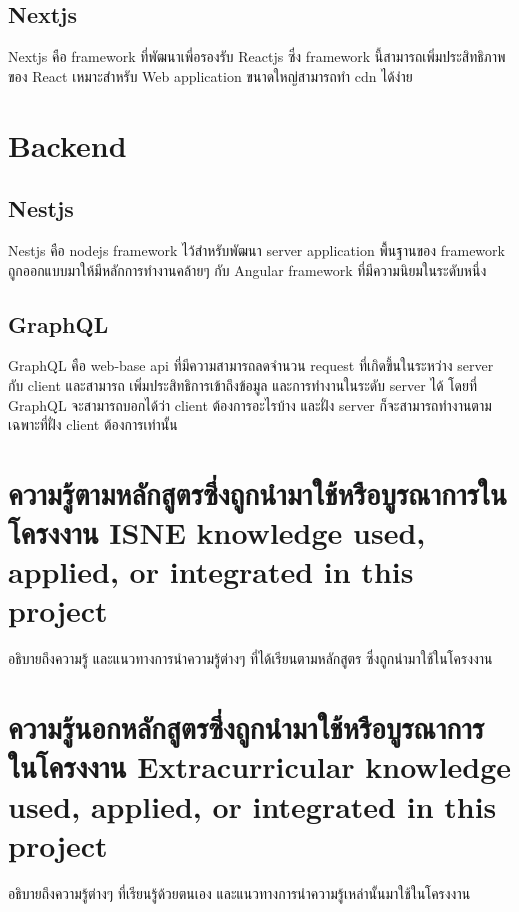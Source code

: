 \subsection{Nextjs}

Nextjs \cite{nextjs} คือ framework \cite{framework} ที่พัฒนาเพี่อรองรับ Reactjs \cite{reactjs} ซึ่ง framework นี้สามารถเพิ่มประสิทธิภาพของ React \cite{reactjs} เหมาะสำหรับ Web application ขนาดใหญ่สามารถทำ cdn \cite{cdn} ได้ง่าย

\section{Backend}

\subsection{Nestjs}

Nestjs \cite{nestjs} คือ nodejs \cite{nodejs} framework \cite{framework} ไว้สำหรับพัฒนา server application \cite {serverapplication} พื้นฐานของ framework ถูกออกแบบมาให้มีหลักการทำงานคล้ายๆ กับ Angular framework \cite{angular} ที่มีความนิยมในระดับหนึ่ง

\subsection{GraphQL}

GraphQL \cite{graphql} คือ web-base api \cite{webapi} ที่มีความสามารถลดจำนวน request ที่เกิดขึ้นในระหว่าง server กับ client และสามารถ เพิ่มประสิทธิการเข้าถึงข้อมูล และการทำงานในระดับ server ได้ โดยที่ GraphQL จะสามารถบอกได้ว่า client ต้องการอะไรบ้าง และฝั่ง server ก็จะสามารถทำงานตามเฉพาะที่ฝั่ง client ต้องการเท่านั้น

\section{\ifcpe%
ความรู้ตามหลักสูตรซึ่งถูกนำมาใช้หรือบูรณาการในโครงงาน
\else%
ISNE knowledge used, applied, or integrated in this project
\fi
}

อธิบายถึงความรู้ และแนวทางการนำความรู้ต่างๆ ที่ได้เรียนตามหลักสูตร ซึ่งถูกนำมาใช้ในโครงงาน

\section{\ifcpe%
ความรู้นอกหลักสูตรซึ่งถูกนำมาใช้หรือบูรณาการในโครงงาน
\else%
Extracurricular knowledge used, applied, or integrated in this project
\fi
}

อธิบายถึงความรู้ต่างๆ ที่เรียนรู้ด้วยตนเอง และแนวทางการนำความรู้เหล่านั้นมาใช้ในโครงงาน

